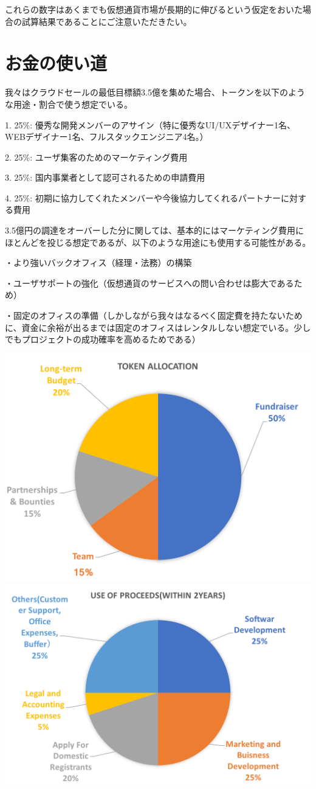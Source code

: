 \documentclass{jsarticle}
\begin{document}
これらの数字はあくまでも仮想通貨市場が長期的に伸びるという仮定をおいた場合の試算結果であることにご注意いただきたい。
\section{お金の使い道}
我々はクラウドセールの最低目標額3.5億を集めた場合、トークンを以下のような用途・割合で使う想定でいる。

1. 25\%: 優秀な開発メンバーのアサイン（特に優秀なUI/UXデザイナー1名、WEBデザイナー1名、フルスタックエンジニア4名。）

2. 25\%: ユーザ集客のためのマーケティング費用

3. 25\%: 国内事業者として認可されるための申請費用

4. 25\%: 初期に協力してくれたメンバーや今後協力してくれるパートナーに対する費用

3.5億円の調達をオーバーした分に関しては、基本的にはマーケティング費用にほとんどを投じる想定であるが、以下のような用途にも使用する可能性がある。

・より強いバックオフィス（経理・法務）の構築 

・ユーザサポートの強化（仮想通貨のサービスへの問い合わせは膨大であるため）

・固定のオフィスの準備（しかしながら我々はなるべく固定費を持たないために、資金に余裕が出るまでは固定のオフィスはレンタルしない想定でいる。少しでもプロジェクトの成功確率を高めるためである）

	\includegraphics[scale=0.4]{img/tokenallocation.png}
	\includegraphics[scale=0.4]{img/useofproceeds.png}
\end{document}
